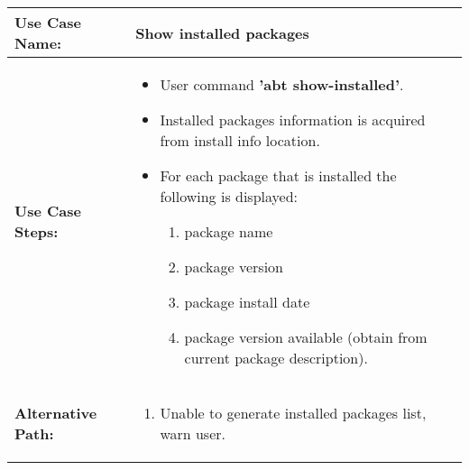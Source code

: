 \medskip

\begin{tabularx}{\linewidth}{|l|X|}
\hline
\textbf{Use Case Name:} & \textbf{Show installed packages} \\
\hline
\textbf{Use Case Steps:} & 
\begin{minipage}{\linewidth} 
  \vspace{0.05em}
  \begin{itemize}
    \item User command \textbf{'abt show-installed'}.
    \item Installed packages information is acquired from install info location.
    \item For each package that is installed the following is displayed:
    \begin{enumerate}
      \item package name
      \item package version
      \item package install date
      \item package version available (obtain from current package description).
    \end{enumerate}
  \end{itemize}
  \vspace{0.05em}
\end{minipage}
\\
\hline 
\textbf{Alternative Path:} &
\begin{minipage}{\linewidth}
  \vspace{0.05em} 
  \begin{enumerate}
    \item Unable to generate installed packages list, warn user.
  \end{enumerate}
  \vspace{0.05em} 
\end{minipage}
\\
\hline
\end{tabularx}

\newpage

